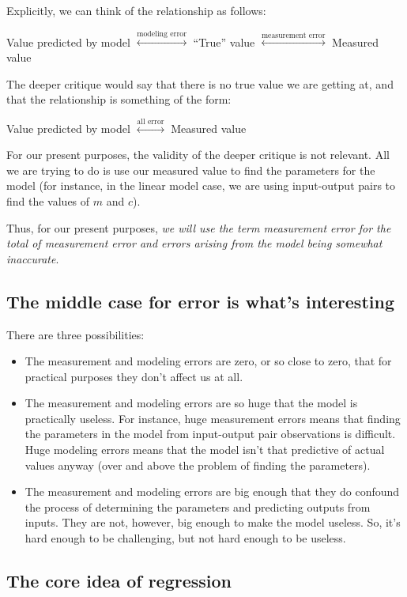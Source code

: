 \documentclass[10pt]{amsart}
\begin{document}
Explicitly, we can think of the relationship as follows:

Value predicted by model $\stackrel{\text{modeling error}}{\leftrightarrow}$ ``True'' value $\stackrel{\text{measurement error}}{\leftrightarrow}$ Measured value

The deeper critique would say that there is no true value we are
getting at, and that the relationship is something of the form:

Value predicted by model $\stackrel{\text{all error}}{\leftrightarrow}$ Measured value

For our present purposes, the validity of the deeper critique is not
relevant. All we are trying to do is use our measured value to find
the parameters for the model (for instance, in the linear model case,
we are using input-output pairs to find the values of $m$ and $c$).

Thus, for our present purposes, {\em we will use the term measurement
  error for the total of measurement error and errors arising from the
  model being somewhat inaccurate}.

\subsection{The middle case for error is what's interesting}

There are three possibilities:

\begin{itemize}
\item The measurement and modeling errors are zero, or so close to
  zero, that for practical purposes they don't affect us at all.
\item The measurement and modeling errors are so huge that the model
  is practically useless. For instance, huge measurement errors means
  that finding the parameters in the model from input-output pair
  observations is difficult. Huge modeling errors means that the model
  isn't that predictive of actual values anyway (over and above the
  problem of finding the parameters).
\item The measurement and modeling errors are big enough that they do
  confound the process of determining the parameters and predicting
  outputs from inputs. They are not, however, big enough to make the
  model useless. So, it's hard enough to be challenging, but not hard
  enough to be useless.
\end{itemize}

\subsection{The core idea of regression}
\end{document}
